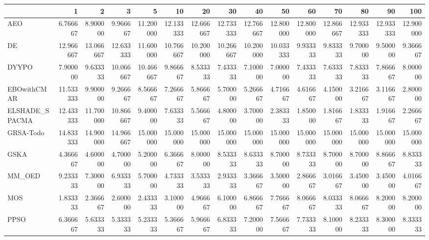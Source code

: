 \begin{tabular}{lrrrrrrrrrrrrrr}
\toprule
{} &        1   &        2   &        3   &        5   &        10  &        20  &        30  &        40  &        50  &        60  &        70  &        80  &        90  &        100 \\
\midrule
AEO            &   6.766667 &   8.900000 &   9.966667 &  11.200000 &  12.133333 &  12.666667 &  12.733333 &  12.766667 &  12.800000 &  12.800000 &  12.866667 &  12.933333 &  12.933333 &  12.900000 \\
DE             &  12.966667 &  13.066667 &  12.633333 &  11.600000 &  10.766667 &  10.200000 &  10.266667 &  10.200000 &  10.033333 &   9.933333 &   9.833333 &   9.700000 &   9.500000 &   9.366667 \\
DYYPO          &   7.900000 &   9.633333 &  10.066667 &  10.466667 &   9.866667 &   8.533333 &   7.433333 &   7.100000 &   7.000000 &   7.433333 &   7.633333 &   7.833333 &   7.866667 &   8.000000 \\
EBOwithCMAR    &  11.533333 &   9.900000 &   9.266667 &   8.566667 &   7.266667 &   5.866667 &   5.700000 &   5.266667 &   4.716667 &   4.616667 &   4.150000 &   3.216667 &   3.116667 &   2.800000 \\
ELSHADE\_SPACMA &  12.433333 &  11.700000 &  10.866667 &   9.400000 &   7.633333 &   5.566667 &   4.800000 &   3.700000 &   2.383333 &   1.850000 &   1.816667 &   1.833333 &   1.916667 &   2.266667 \\
GRSA-Todo      &  14.833333 &  14.900000 &  14.966667 &  15.000000 &  15.000000 &  15.000000 &  15.000000 &  15.000000 &  15.000000 &  15.000000 &  15.000000 &  15.000000 &  15.000000 &  15.000000 \\
GSKA           &   4.366667 &   4.600000 &   4.700000 &   5.200000 &   6.366667 &   8.000000 &   8.533333 &   8.633333 &   8.700000 &   8.733333 &   8.700000 &   8.700000 &   8.866667 &   8.833333 \\
MM\_OED         &   9.233333 &   7.300000 &   6.933333 &   5.700000 &   4.733333 &   3.533333 &   2.933333 &   3.366667 &   3.500000 &   2.866667 &   3.016667 &   3.450000 &   3.450000 &   4.016667 \\
MOS            &   1.833333 &   2.366667 &   2.600000 &   2.433333 &   3.100000 &   4.966667 &   6.100000 &   6.866667 &   7.766667 &   8.066667 &   8.033333 &   8.066667 &   8.200000 &   8.200000 \\
PPSO           &   6.366667 &   5.633333 &   5.333333 &   5.233333 &   5.366667 &   5.966667 &   6.833333 &   7.200000 &   7.566667 &   7.733333 &   8.100000 &   8.233333 &   8.300000 &   8.333333 \\

\end{tabular}
